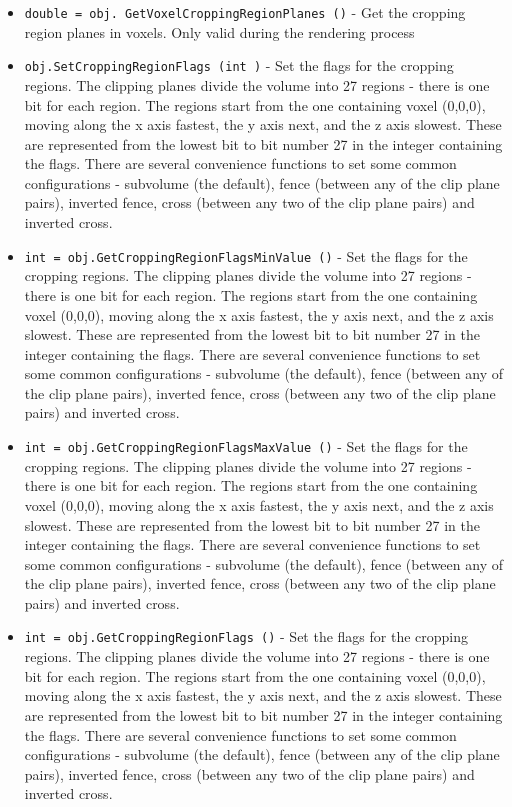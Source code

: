 \begin{itemize}
\item  \verb|double = obj. GetVoxelCroppingRegionPlanes ()| -  Get the cropping region planes in voxels. Only valid during the 
 rendering process

\item  \verb|obj.SetCroppingRegionFlags (int )| -  Set the flags for the cropping regions. The clipping planes divide the
 volume into 27 regions - there is one bit for each region. The regions 
 start from the one containing voxel (0,0,0), moving along the x axis 
 fastest, the y axis next, and the z axis slowest. These are represented 
 from the lowest bit to bit number 27 in the integer containing the 
 flags. There are several convenience functions to set some common 
 configurations - subvolume (the default), fence (between any of the 
 clip plane pairs), inverted fence, cross (between any two of the 
 clip plane pairs) and inverted cross.

\item  \verb|int = obj.GetCroppingRegionFlagsMinValue ()| -  Set the flags for the cropping regions. The clipping planes divide the
 volume into 27 regions - there is one bit for each region. The regions 
 start from the one containing voxel (0,0,0), moving along the x axis 
 fastest, the y axis next, and the z axis slowest. These are represented 
 from the lowest bit to bit number 27 in the integer containing the 
 flags. There are several convenience functions to set some common 
 configurations - subvolume (the default), fence (between any of the 
 clip plane pairs), inverted fence, cross (between any two of the 
 clip plane pairs) and inverted cross.

\item  \verb|int = obj.GetCroppingRegionFlagsMaxValue ()| -  Set the flags for the cropping regions. The clipping planes divide the
 volume into 27 regions - there is one bit for each region. The regions 
 start from the one containing voxel (0,0,0), moving along the x axis 
 fastest, the y axis next, and the z axis slowest. These are represented 
 from the lowest bit to bit number 27 in the integer containing the 
 flags. There are several convenience functions to set some common 
 configurations - subvolume (the default), fence (between any of the 
 clip plane pairs), inverted fence, cross (between any two of the 
 clip plane pairs) and inverted cross.

\item  \verb|int = obj.GetCroppingRegionFlags ()| -  Set the flags for the cropping regions. The clipping planes divide the
 volume into 27 regions - there is one bit for each region. The regions 
 start from the one containing voxel (0,0,0), moving along the x axis 
 fastest, the y axis next, and the z axis slowest. These are represented 
 from the lowest bit to bit number 27 in the integer containing the 
 flags. There are several convenience functions to set some common 
 configurations - subvolume (the default), fence (between any of the 
 clip plane pairs), inverted fence, cross (between any two of the 
 clip plane pairs) and inverted cross.


\end{itemize}
